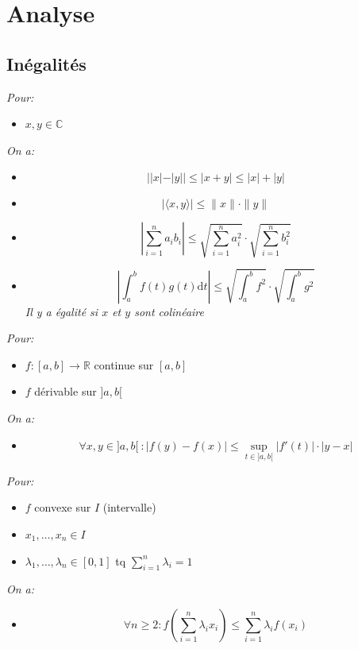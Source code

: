 \documentclass[a4paper,12pt]{report}
\newcommand{\Thm}[2]{\begin{tcolorbox}[colback=white,colframe=Red!60, title=Théorème : #1]#2\end{tcolorbox}}
\def\C{\mathbb{C}}
\newcommand{\dt}{\mathrm{d}t}
\begin{document}
\tableofcontents
\renewcommand{\labelitemi}{$\cdot$}

\chapter{Analyse}
\section{Inégalités}

\Thm{Inégalité triangulaire}{ 
\textit{Pour:}
\begin{itemize}
  \item[] \(x,y \in\C\)
\end{itemize}
\textit{On a:}
\begin{itemize}
  \item[] \[||x|-|y||\leq|x+y|\leq|x|+|y|\]
\end{itemize}
}
\Thm{Inégalité de Cauchy-Schwartz (+ cas d'égalité)}{
\begin{itemize}
  \item[] \[ | \langle x, y \rangle | \leq \|x\| \cdot \|y\| \]
  \item[] \[ | \sum_{i=1}^n a_ib_i | \leq \sqrt{\sum_{i=1}^n a_i ^2 } \cdot \sqrt{\sum_{i=1}^n b_i ^2 } \]
  \item[] \[ | \int_{a}^b f(t) g(t) \dt | \leq \sqrt{\int_{a}^b f ^2 } \cdot \sqrt{\int_{a}^b g^2 } \]
  \textit{Il y a égalité si $x$ et $y$ sont colinéaire}
\end{itemize}
}
\Thm{Inégalité des accroissements finis}{
\textit{Pour:}
\begin{itemize}
  \item[] \(f : [a,b] \to \mathbb{R}\) continue sur \([a,b]\) 
  \item[] \(f\) dérivable sur \(]a,b[\)
\end{itemize}
\textit{On a:}
\begin{itemize}
  \item[] \[\forall x, y \in ]a, b[\ : |f(y)-f(x)|\leq \sup_{t \in ]a,b[} |f'(t)|\cdot |y-x| \]
\end{itemize}
}

\Thm{Inégalité de Jensen}{
  \textit{Pour:}
  \begin{itemize}
    \item[] \(f\) convexe sur \(I\) (intervalle)
    \item[] \(x_1,\dots,x_n\in I\)
    \item[] \(\lambda_1,\dots,\lambda_n\in[0,1]\) tq \(\sum_{i=1}^n \lambda_i=1\)    
  \end{itemize}
  \textit{On a:}
  \begin{itemize}
    \item[]\[\forall n\geq 2 : f\left(\sum_{i=1}^n \lambda_i x_i\right)\leq \sum_{i=1}^n \lambda_i f(x_i)\]
  \end{itemize}
}
\end{document}
